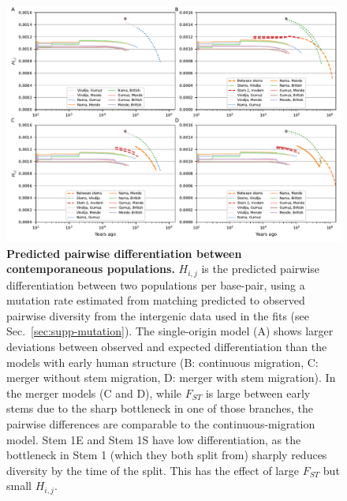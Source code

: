 \documentclass[]{article}
\begin{document}
\begin{figure}[ht]
    \centering
    \includegraphics[width=\textwidth]{figures/supp-h12s-all-models.pdf}
    \caption{
        \textbf{Predicted pairwise differentiation between contemporaneous
        populations.} $H_{i,j}$ is the predicted pairwise differentiation
        between two populations per base-pair, using a mutation rate estimated
        from matching predicted to observed pairwise diversity from the
        intergenic data used in the fits (see Sec.~\ref{sec:supp-mutation}).
        The single-origin model (A) shows larger deviations between observed
        and expected differentiation than the models with early human structure
        (B: continuous migration, C: merger without stem migration, D: merger
        with stem migration). In the merger models (C and D), while $F_{ST}$ is
        large between early stems due to the sharp bottleneck in one of those
        branches, the pairwise differences are comparable to the
        continuous-migration model. Stem 1E and Stem 1S have low
        differentiation, as the bottleneck in Stem 1 (which they both split
        from) sharply reduces diversity by the time of the split. This has the
        effect of large $F_{ST}$ but small $H_{i,j}$.
    }
    \label{fig:supp-h12-panels}
\end{figure}
\end{document}
